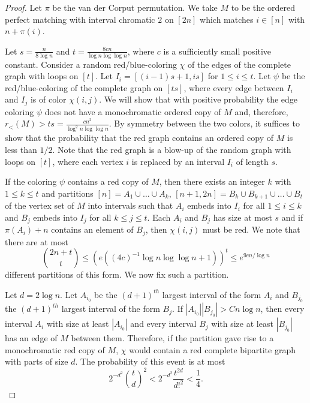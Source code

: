 \documentclass[11pt]{article}
\begin{document}
\begin{proof}
Let $\pi$ be the van der Corput permutation. We take $M$ to be the ordered perfect matching with interval chromatic $2$ on $[2n]$ which matches $i \in [n]$ with $n+\pi(i)$.  

Let $s = \frac{n}{8 \log n}$ and $t = \frac{8 c n}{\log n \log \log n}$, where $c$ is a sufficiently small positive constant. Consider a random red/blue-coloring $\chi$ of the edges of the complete graph with loops on $[t]$. Let $I_i=[(i-1)s+1,is]$ for $1 \leq i \leq t$. Let $\psi$ be the red/blue-coloring of the complete graph on $[ts]$, where every edge between $I_i$ and $I_j$ is of color $\chi(i,j)$. 
We will show that with positive probability the edge coloring $\psi$ does not have a monochromatic ordered copy of $M$ and, therefore, $r_{<}(M) > ts= \frac{c n^2}{\log^2 n \log \log n}$. By symmetry between the two colors, it suffices to show that the probability that the red graph contains an ordered copy of $M$ is less than $1/2$. Note that the red graph is a blow-up of the random graph with loops on $[t]$, where each vertex $i$ is replaced by an interval $I_i$ of length $s$.

If the coloring $\psi$ contains a red copy of $M$, then there exists an integer $k$ with $1 \leq k \leq t$ and partitions $[n]=A_1 \cup \dots \cup A_k$, $[n+1,2n]=B_k \cup B_{k+1} \cup \dots \cup B_t$ of the vertex set of $M$ into intervals such that $A_i$ embeds into $I_i$ for all $1 \leq i \leq k$ and $B_j$ embeds into $I_j$ for all $k \leq j \leq t$. Each $A_i$ and $B_j$ has size at most $s$ and if $\pi(A_i) + n$ contains an element of $B_j$, then $\chi(i,j)$ must be red. We note that there are at most
\[\binom{2n + t}{t} \le\left(e((4c)^{-1} \log n \log \log n + 1)\right)^{t}\le e^{9c n/\log n}\]
different partitions of this form. We now fix such a partition.

Let $d=2\log n$. Let $A_{i_0}$ be the $(d+1)^{th}$ largest interval of the form $A_i$ and $B_{j_0}$ the $(d+1)^{th}$ largest interval of the form $B_j$. If $|A_{i_0}||B_{j_0}| > Cn\log n$, then every interval $A_i$ with size at least $|A_{i_0}|$ and every interval $B_j$ with size at least $|B_{j_0}|$ has an edge of $M$ between them. Therefore, if the partition gave rise to a monochromatic red copy of $M$, $\chi$ would contain a red complete bipartite graph with parts of size $d$. The probability of this event is at most
\[
	2^{-d^2}{t \choose d}^2<2^{-d^2} \frac{t^{2d}}{d!^2} < \frac{1}{4}.
\]


\end{proof}
\end{document}
